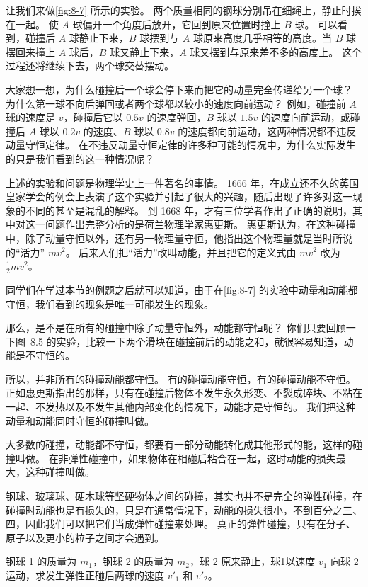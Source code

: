 让我们来做\cref{fig:8-7} 所示的实验。
两个质量相同的钢球分别吊在细绳上，静止时挨在一起。
使 $A$ 球偏开一个角度后放开，它回到原来位置时撞上 $B$ 球。
可以看到，碰撞后 $A$ 球静止下来，$B$ 球摆到与 $A$ 球原来高度几乎相等的高度。当 $B$ 球摆回来撞上 $A$ 球后，$B$ 球又静止下来，$A$ 球又摆到与原来差不多的高度上。
这个过程还将继续下去，两个球交替摆动。

大家想一想，为什么碰撞后一个球会停下来而把它的动量完全传递给另一个球？
为什么第一球不向后弹回或者两个球都以较小的速度向前运动？
例如，碰撞前 $A$ 球的速度是 $v$，碰撞后它以 $0.5v$ 的速度弹回，$B$ 球以 $1.5v$ 的速度向前运动，或碰撞后 $A$ 球以 $0.2v$ 的速度、$B$ 球以 $0.8v$ 的速度都向前运动，这两种情况都不违反动量守恒定律。
在不违反动量守恒定律的许多种可能的情况中，为什么实际发生的只是我们看到的这一种情况呢？

上述的实验和问题是物理学史上一件著名的事情。
1666 年，在成立还不久的英国皇家学会的例会上表演了这个实验并引起了很大的兴趣，随后出现了许多对这一现象的不同的甚至是混乱的解释。
到 1668 年，才有三位学者作出了正确的说明，其中对这一问题作出完整分析的是荷兰物理学家惠更斯。
惠更斯认为，在这种碰撞中，除了动量守恒以外，还有另一物理量守恒，他指出这个物理量就是当时所说的“活力” $mv^2$。
后来人们把“活力”改叫动能，并且把它的定义式由 $mv^2$ 改为 $\frac{1}{2}mv^2$。

同学们在学过本节的例题之后就可以知道，由于在\cref{fig:8-7} 的实验中动量和动能都守恒，我们看到的现象是唯一可能发生的现象。

那么，是不是在所有的碰撞中除了动量守恒外，动能都守恒呢？
你们只要回顾一下图~8.5 的实验，比较一下两个滑块在碰撞前后的动能之和，就很容易知道，动能是不守恒的。

所以，并非所有的碰撞动能都守恒。
有的碰撞动能守恒，有的碰撞动能不守恒。
正如惠更斯指出的那样，只有在碰撞后物体不发生永久形变、不裂成碎块、不粘在一起、不发热以及不发生其他内部变化的情况下，动能才是守恒的。
我们把这种动量和动能同时守恒的碰撞叫做。

大多数的碰撞，动能都不守恒，都要有一部分动能转化成其他形式的能，这样的碰撞叫做。
在非弹性碰撞中，如果物体在相碰后粘合在一起，这时动能的损失最大，这种碰撞叫做。

钢球、玻璃球、硬木球等坚硬物体之间的碰撞，其实也并不是完全的弹性碰撞，在碰撞时动能也是有损失的，只是在通常情况下，动能的损失很小，不到百分之三、四，因此我们可以把它们当成弹性碰撞来处理。
真正的弹性碰撞，只有在分子、原子以及更小的粒子之间才会遇到。

\begin{example}
  钢球 1 的质量为 $m_1$，钢球 2 的质量为 $m_2$，球 2 原来静止，球1以速度 $v_1$ 向球 2 运动，求发生弹性正碰后两球的速度 $v'_1$ 和 $v'_2$。
\end{example}

